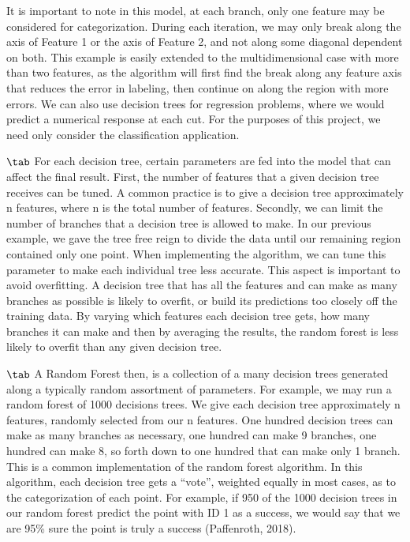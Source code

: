 It is important to note in this model, at each branch, only one feature may be considered for categorization. During each iteration, we may only break along the axis of Feature 1 or the axis of Feature 2, and not along some diagonal dependent on both. This example is easily extended to the multidimensional case with more than two features, as the algorithm will first find the break along any feature axis that reduces the error in labeling, then continue on along the region with more errors. We can also use decision trees for regression problems, where we would predict a numerical response at each cut. For the purposes of this project, we need only consider the classification application. \newline

$\tab$ For each decision tree, certain parameters are fed into the model that can affect the final result. First, the number of features that a given decision tree receives can be tuned. A common practice is to give a decision tree approximately n features, where n is the total number of features. Secondly, we can limit the number of branches that a decision tree is allowed to make. In our previous example, we gave the tree free reign to divide the data until our remaining region contained only one point. When implementing the algorithm, we can tune this parameter to make each individual tree less accurate. This aspect is important to avoid overfitting. A decision tree that has all the features and can make as many branches as possible is likely to overfit, or build its predictions too closely off the training data. By varying which features each decision tree gets, how many branches it can make and then by averaging the results, the random forest is less likely to overfit than any given decision tree.  
\newline 

$\tab$ A Random Forest then, is a collection of a many decision trees generated along a typically random assortment of parameters. For example, we may run a random forest of 1000 decisions trees. We give each decision tree approximately n features, randomly selected from our n features. One hundred decision trees can make as many branches as necessary, one hundred can make 9 branches, one hundred can make 8, so forth down to one hundred that can make only 1 branch. This is a common implementation of the random forest algorithm. In this algorithm, each decision tree gets a “vote”, weighted equally in most cases, as to the categorization of each point. For example, if 950 of the 1000 decision trees in our random forest predict the point with ID 1 as a success, we would say that we are 95\% sure the point is truly a success (Paffenroth, 2018). \newline

